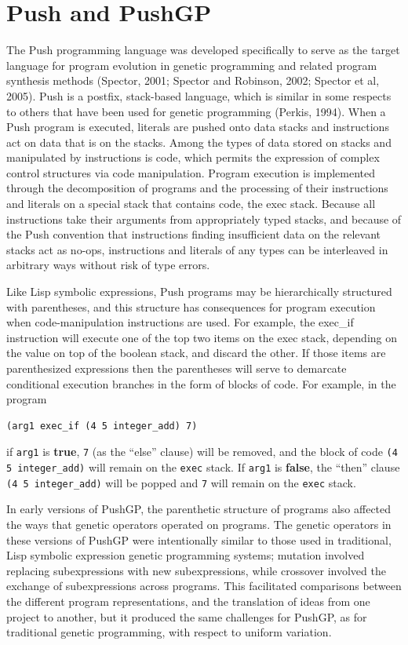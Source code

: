 \documentclass[graybox]{svmult}
\begin{document}
\section{Push and PushGP}
\label{pushgp}

The Push programming language was developed specifically to serve as the target language for program evolution in genetic programming and related program synthesis methods
(Spector, 2001; Spector and Robinson, 2002; Spector et al, 2005). Push is a postfix, stack-based language, which is similar in some respects to others that have been used for genetic programming (Perkis, 1994). 
When a Push program is executed, literals are pushed
onto data stacks and instructions act on data that is on the stacks.
Among the types of data stored on stacks and manipulated by instructions is {\ttfamily code}, which permits the expression of complex control structures via code manipulation. Program execution is implemented through the decomposition of programs and the processing of their instructions and literals on a special stack that contains code, the {\ttfamily exec} stack.
Because all instructions take their arguments from appropriately typed stacks, and because of the Push convention that instructions finding insufficient data on the relevant stacks
act as {\ttfamily no-op}s, instructions and literals of any types can be interleaved in arbitrary ways without risk of type errors.

Like Lisp symbolic expressions, Push programs may be hierarchically
structured with parentheses, and this structure has consequences for program execution when code-manipulation instructions are used. For example, the {\ttfamily exec\_if} instruction will execute one of the top two items on the {\ttfamily exec} stack, depending on the value on top of the {\ttfamily boolean} stack, and discard the other. If those items are parenthesized expressions then the parentheses will serve to demarcate conditional execution branches in the form of blocks of code. For example, in the program
\begin{verbatim}
(arg1 exec_if (4 5 integer_add) 7)
\end{verbatim}
if \texttt{arg1} is \textbf{true}, \texttt{7} (as the ``else'' clause) will be removed, and the block of code \texttt{(4 5 integer\_add)} will remain on the \texttt{exec} stack. If \texttt{arg1} is \textbf{false}, the ``then'' clause \texttt{(4 5 integer\_add)} will be popped and \texttt{7} will remain on the \texttt{exec} stack.

In early versions of PushGP, the parenthetic structure of programs also affected the ways that  genetic
operators operated on programs. The genetic operators in these versions of PushGP were intentionally similar to those used in traditional, Lisp symbolic expression genetic programming systems; mutation involved replacing subexpressions with new subexpressions, while crossover involved the exchange of subexpressions across programs. This facilitated comparisons between the different program representations, and the translation of ideas from one project to another, but it produced the same challenges for PushGP, as for traditional genetic programming, with respect to uniform variation.
\end{document}
